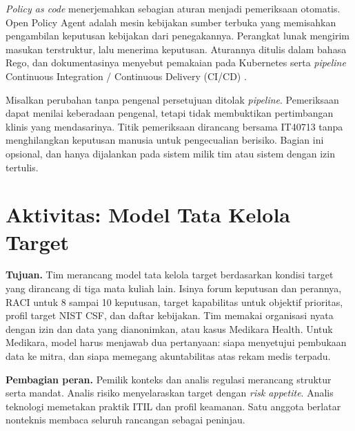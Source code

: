 \begin{pendalaman}
\textit{Policy as code} menerjemahkan sebagian aturan menjadi pemeriksaan otomatis. Open Policy
Agent adalah mesin kebijakan sumber terbuka yang memisahkan pengambilan keputusan kebijakan dari
penegakannya. Perangkat lunak mengirim masukan terstruktur, lalu menerima keputusan. Aturannya
ditulis dalam bahasa Rego, dan dokumentasinya menyebut pemakaian pada Kubernetes serta
\textit{pipeline} Continuous Integration / Continuous Delivery (CI/CD) \cite{c08-opa}.

Misalkan perubahan tanpa pengenal persetujuan ditolak \textit{pipeline}. Pemeriksaan dapat menilai
keberadaan pengenal, tetapi tidak membuktikan pertimbangan klinis yang mendasarinya. Titik
pemeriksaan dirancang bersama IT40713 tanpa menghilangkan keputusan manusia untuk pengecualian
berisiko. Bagian ini opsional, dan hanya dijalankan pada sistem milik tim atau sistem dengan izin
tertulis.
\end{pendalaman}

\section{Aktivitas: Model Tata Kelola Target}

\textbf{Tujuan.} Tim merancang model tata kelola target berdasarkan kondisi target yang dirancang
di tiga mata kuliah lain. Isinya forum keputusan dan perannya, RACI untuk 8 sampai 10 keputusan,
target kapabilitas untuk objektif prioritas, profil target NIST CSF, dan daftar kebijakan. Tim
memakai organisasi nyata dengan izin dan data yang dianonimkan, atau kasus Medikara Health. Untuk
Medikara, model harus menjawab dua pertanyaan: siapa menyetujui pembukaan data ke mitra, dan siapa
memegang akuntabilitas atas rekam medis terpadu.

\textbf{Pembagian peran.} Pemilik konteks dan analis regulasi merancang struktur serta mandat.
Analis risiko menyelaraskan target dengan \textit{risk appetite}. Analis teknologi memetakan
praktik ITIL dan profil keamanan. Satu anggota berlatar nonteknis membaca seluruh rancangan sebagai
peninjau.

